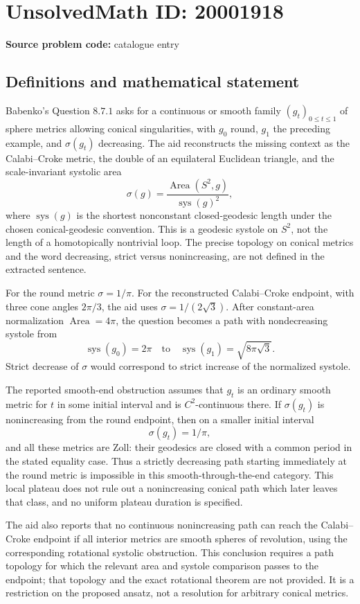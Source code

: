 \documentclass[11pt]{article}
\begin{document}
\section*{UnsolvedMath ID: 20001918}
\textbf{Source problem code:} catalogue entry
\subsection{Definitions and mathematical statement}
Babenko's Question \(8.7.1\) asks for a continuous or smooth family \((g_t)_{0\leq t\leq1}\) of sphere metrics allowing conical singularities, with \(g_0\) round, \(g_1\) the preceding example, and \(\sigma(g_t)\) decreasing. The aid reconstructs the missing context as the Calabi--Croke metric, the double of an equilateral Euclidean triangle, and the scale-invariant systolic area
\[
 \sigma(g)=\frac{\operatorname{Area}(S^2,g)}{\operatorname{sys}(g)^2},
\]
where \(\operatorname{sys}(g)\) is the shortest nonconstant closed-geodesic length under the chosen conical-geodesic convention. This is a geodesic systole on \(S^2\), not the length of a homotopically nontrivial loop. The precise topology on conical metrics and the word decreasing, strict versus nonincreasing, are not defined in the extracted sentence.

For the round metric \(\sigma=1/\pi\). For the reconstructed Calabi--Croke endpoint, with three cone angles \(2\pi/3\), the aid uses \(\sigma=1/(2\sqrt3)\). After constant-area normalization \(\operatorname{Area}=4\pi\), the question becomes a path with nondecreasing systole from
\[
 \operatorname{sys}(g_0)=2\pi\quad\text{to}\quad
 \operatorname{sys}(g_1)=\sqrt{8\pi\sqrt3}.
\]
Strict decrease of \(\sigma\) would correspond to strict increase of the normalized systole.

The reported smooth-end obstruction assumes that \(g_t\) is an ordinary smooth metric for \(t\) in some initial interval and is \(C^2\)-continuous there. If \(\sigma(g_t)\) is nonincreasing from the round endpoint, then on a smaller initial interval
\[
 \sigma(g_t)=1/\pi,
\]
and all these metrics are Zoll: their geodesics are closed with a common period in the stated equality case. Thus a strictly decreasing path starting immediately at the round metric is impossible in this smooth-through-the-end category. This local plateau does not rule out a nonincreasing conical path which later leaves that class, and no uniform plateau duration is specified.

The aid also reports that no continuous nonincreasing path can reach the Calabi--Croke endpoint if all interior metrics are smooth spheres of revolution, using the corresponding rotational systolic obstruction. This conclusion requires a path topology for which the relevant area and systole comparison passes to the endpoint; that topology and the exact rotational theorem are not provided. It is a restriction on the proposed ansatz, not a resolution for arbitrary conical metrics.
\end{document}
